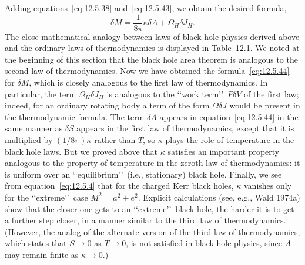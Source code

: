 Adding equations~\eqref{eq:12.5.38} and~\eqref{eq:12.5.43}, we obtain the desired
formula,
\begin{equation}
 \delta M=\frac1{8\pi}\kappa\delta A+\Omega_H\delta J_H .
 \tag{12.5.44}\label{eq:12.5.44}
\end{equation}
The close mathematical analogy between laws of black hole physics derived above and
the ordinary laws of thermodynamics is displayed in Table~12.1. We noted at the
beginning of this section that the black hole area theorem is analogous to the second
law of thermodynamics. Now we have obtained the formula~\eqref{eq:12.5.44} for
\(\delta M\), which is closely analogous to the first law of thermodynamics. In
particular, the term \(\Omega_H\delta J_H\) is analogous to the \lq\lq work term\rq\rq\
\(P\delta V\) of the first law; indeed, for an ordinary rotating body a term of the
form \(\Omega\delta J\) would be present in the thermodynamic formula. The term
\(\delta A\) appears in equation~\eqref{eq:12.5.44} in the same manner as \(\delta S\)
appears in the first law of thermodynamics, except that it is multiplied by
\((1/8\pi)\kappa\) rather than \(T\), so \(\kappa\) plays the role of temperature in the
black hole laws. But we proved above that \(\kappa\) satisfies an important property
analogous to the property of temperature in the zeroth law of thermodynamics: it is
uniform over an \lq\lq equilibrium\rq\rq\ (i.e., stationary) black hole. Finally, we see
from equation~\eqref{eq:12.5.4} that for the charged Kerr black holes, \(\kappa\)
vanishes only for the \lq\lq extreme\rq\rq\ case \(M^2=a^2+e^2\). Explicit calculations
(see, e.g., Wald 1974a) show that the closer one gets to an \lq\lq extreme\rq\rq\ black
hole, the harder it is to get a further step closer, in a manner similar to the third law
of thermodynamics. (However, the analog of the alternate version of the third law of
thermodynamics, which states that \(S\to0\) as \(T\to0\), is not satisfied in black
hole physics, since \(A\) may remain finite as \(\kappa\to0\).)



